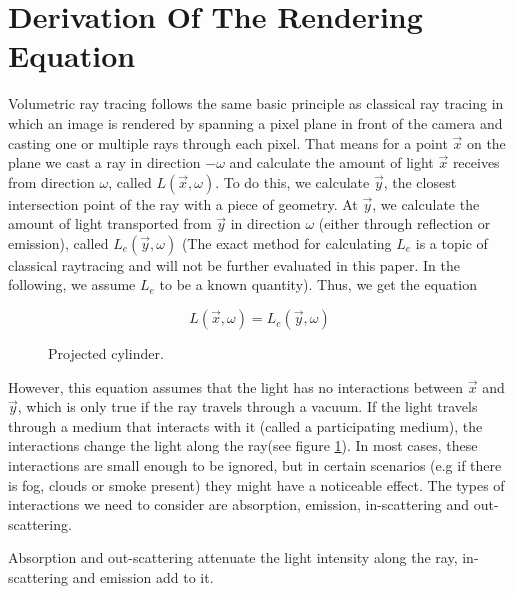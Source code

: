 \section{Derivation Of The Rendering Equation}
Volumetric ray tracing follows the same basic principle as classical ray tracing in which an image is rendered by spanning a pixel plane in front of the camera and casting one or multiple rays through each pixel.
That means for a point $\vec{x}$ on the plane we cast a ray in direction $-\omega$ and calculate the amount of light $\vec{x}$ receives from direction $\omega$, called $L(\vec{x},\omega )$\cite{10.5555/94788}.
To do this, we calculate $\vec{y}$, the closest intersection point of the ray with a piece of geometry. At $\vec{y}$, we calculate the amount of light transported from $\vec{y}$ in direction $\omega$ (either through reflection or emission), called $L_e(\vec{y},\omega )$ (The exact method for calculating $L_e$ is a topic of classical raytracing\cite{10.5555/94788} and will not be further evaluated in this paper. In the following, we assume $L_e$ to be a known quantity).
Thus, we get the equation 

\begin{equation}\label{eq:no_attenuation}
L(\vec{x},\omega ) = L_e(\vec{y}, \omega )
\end{equation}

\begin{figure}
\centering
\def\svgwidth{\columnwidth}


  \caption{\label{fig:light_interactions}
         Projected cylinder.}
\end{figure}
However, this equation assumes that the light has no interactions between $\vec{x}$ and $\vec{y}$, which is only true if the ray travels through a vacuum. If the light travels through a medium that interacts with it (called a participating medium), the interactions change the light along the ray\cite{10.5555/275458.275468}(see figure \ref{fig:light_interactions}). In most cases, these interactions are small enough to be ignored, but in certain scenarios (e.g if there is fog, clouds or smoke present) they might have a noticeable effect. The types of interactions we need to consider are absorption, emission, in-scattering and out-scattering\cite{468400}.

Absorption and out-scattering attenuate the light intensity along the ray, in-scattering and emission add to it.
